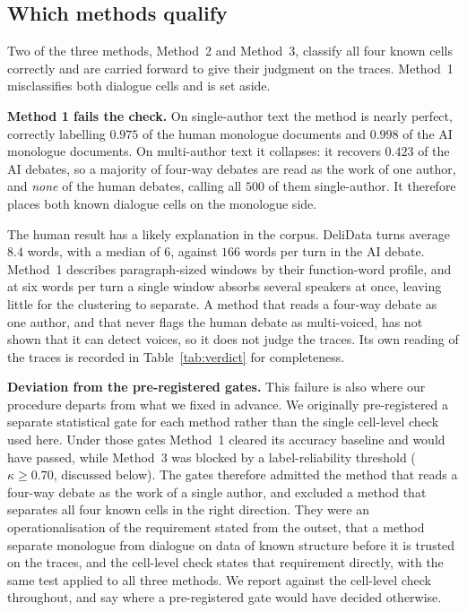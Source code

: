\documentclass[10pt,twocolumn]{article}
\begin{document}
\subsection{Which methods qualify}
Two of the three methods, Method~2 and Method~3, classify all four known cells correctly and are
carried forward to give their judgment on the traces. Method~1 misclassifies both dialogue cells and
is set aside.

\textbf{Method 1 fails the check.} On single-author text the method is nearly perfect, correctly
labelling $0.975$ of the human monologue documents and $0.998$ of the AI monologue documents. On
multi-author text it collapses: it recovers $0.423$ of the AI debates, so a majority of four-way
debates are read as the work of one author, and \emph{none} of the human debates, calling all $500$
of them single-author. It therefore places both known dialogue cells on the monologue side.

The human result has a likely explanation in the corpus. DeliData turns average $8.4$ words, with a
median of $6$, against $166$ words per turn in the AI debate. Method~1 describes paragraph-sized
windows by their function-word profile, and at six words per turn a single window absorbs several
speakers at once, leaving little for the clustering to separate. A method that reads a four-way
debate as one author, and that never flags the human debate as multi-voiced, has not shown that it
can detect voices, so it does not judge the traces. Its own reading of the traces is recorded in
Table~\ref{tab:verdict} for completeness.

\textbf{Deviation from the pre-registered gates.} This failure is also where our procedure departs
from what we fixed in advance. We originally pre-registered a separate statistical gate for each
method rather than the single cell-level check used here. Under those gates Method~1 cleared its
accuracy baseline and would have passed, while Method~3 was blocked by a label-reliability threshold
($\kappa \ge 0.70$, discussed below). The gates therefore admitted the method that reads a four-way
debate as the work of a single author, and excluded a method that separates all four known cells in
the right direction. They were an operationalisation of the requirement stated from the outset, that
a method separate monologue from dialogue on data of known structure before it is trusted on the
traces, and the cell-level check states that requirement directly, with the same test applied to all
three methods. We report against the cell-level check throughout, and say where a pre-registered gate
would have decided otherwise.
\end{document}
